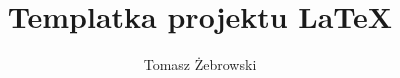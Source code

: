 \documentclass{article}
\begin{document}
\title{Templatka projektu \LaTeX}
\author{Tomasz Żebrowski}
\maketitle
\end{document}
